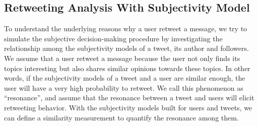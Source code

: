 \documentclass[twocolumn]{svjour3}          %
\begin{document}
\subsection{Retweeting Analysis With Subjectivity Model }
\label{formulation}

To understand the underlying reasons why a user retweet a message, we try to simulate the subjective decision-making procedure by investigating the relationship among the subjectivity models of a tweet, its author and followers. 
We assume that a user retweet a message because the user not only finds its topics interesting but also shares similar opinions towards these topics. In other words, if the subjectivity models of a tweet and a user are similar enough, the user will have a very high probability to retweet. 
We call this phenomenon as ``resonance'', and assume that the resonance between a tweet and users will elicit retweeting behavior.
With the subjectivity models built for users and tweets, we can define a similarity measurement to quantify the resonance among them.
\end{document}
